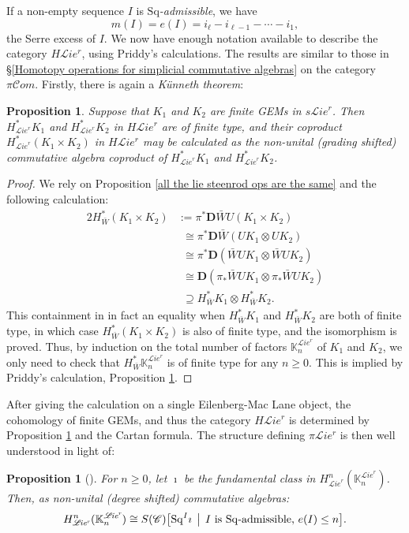 \documentclass[11pt]{amsart} \renewcommand{\baselinestretch}{1.4}
\theoremstyle{plain}
\newtheorem{prop}[thm]{Proposition}
\theoremstyle{definition}
\newcommand{\scrL}{\mathscr{L}}
\newcommand{\scrC}{\mathscr{C}}
\newcommand{\citeBOX}[2][]{\cite[\mbox{#1}]{#2}}
\newcommand{\CommOperad}{{\scrC}}
\newcommand{\PA}[1]{\pi#1}
\newcommand{\HA}[1]{H#1}
\newcommand{\minDimDelta}{m}
\newcommand{\Sq}{\mathrm{Sq}}
\newcommand{\algs}{{\scrC\!\textit{om}}}
\newcommand{\restliealgs}{{\scrL\!\textit{ie}^\textit{r}}}
\newcommand{\dual}{\mathbf{D}}
\begin{document}
\begin{Constructing cohomology operations}
If a non-empty sequence $I$  is \emph{$\Sq$-admissible}, we have 
\[\minDimDelta(I)=e(I)=i_\ell-i_{\ell-1}-\cdots -i_1,\]
the Serre excess of $I$. We now have enough notation available to describe the category $\HA{\restliealgs}$, using Priddy's calculations. The results are similar to those in \S\ref{Homotopy operations for simplicial commutative algebras} on the category $\PA{\algs}$.
Firstly, there is again  a \emph{K\"unneth theorem}:
\begin{prop}
\label{Prop on cohomology of product of finite lie gems}
Suppose that $K_1$ and $K_2$ are finite GEMs in $s\restliealgs$. Then $H^*_\restliealgs K_1$ and $H^*_\restliealgs K_2$ in $\HA{\restliealgs}$ are of finite type, and their coproduct
$H^*_\restliealgs(K_1\times K_2)$ in $\HA{\restliealgs}$ may be calculated as the non-unital (grading shifted) commutative algebra coproduct of $H^*_\restliealgs K_1$ and $H^*_\restliealgs K_2$.
\end{prop}
\begin{proof}
We rely on Proposition \ref{all the lie steenrod ops are the same} and the following calculation:
\begin{alignat*}{2}
H^*_{\bar{W}}(K_1\times K_2)
&:=
\pi^*\dual \bar{W}U(K_1\times K_2)%
\\
&\phantom{:}\cong
\pi^*\dual \bar{W}(UK_1\otimes UK_2)%
\\
&\phantom{:}\cong
\pi^*\dual (\bar{W}UK_1\otimes \bar{W}UK_2)%
\\
&\phantom{:}\cong
\dual (\pi_*\bar{W}UK_1\otimes \pi_*\bar{W}UK_2)%
\\
&\phantom{:}\supseteq
H^*_{\bar{W}}K_1\otimes H^*_{\bar{W}}K_2.
\end{alignat*}
This containment in in fact an equality when $H^*_{\bar{W}}K_1 $ and $H^*_{\bar{W}}K_2$ are both of finite type, in which case $H^*_{\bar{W}}(K_1\times K_2)$ is also of finite type, and the isomorphism is proved. Thus, by induction on the total number of factors $\mathbb{K}_n^{\restliealgs}$ of $K_1$ and $K_2$, we only need to check that $H^*_{\bar{W}}\mathbb{K}_n^{\restliealgs}$ is of finite type for any $n\geq0$. This is implied by Priddy's calculation, Proposition \ref{calc of restliecoh on single EMobject}.
\end{proof}
\noindent After giving the calculation on a single Eilenberg-Mac Lane object, the cohomology of finite GEMs, and thus the category $\HA{\restliealgs}$ is determined by Proposition \ref{Prop on cohomology of product of finite lie gems} and the Cartan formula. The structure defining $\PA{\restliealgs}$ is then well understood in light of:
\begin{prop}[{\citeBOX[6.1]{PriddySimplicialLie.pdf}}]
\label{calc of restliecoh on single EMobject}
For $n\geq0$, let $\imath$ be the fundamental class in $H^n_{\restliealgs}(\mathbb{K}_n^{\restliealgs})$. Then, as non-unital (degree shifted) commutative algebras:
\[H^n_{\restliealgs}(\mathbb{K}_n^{\restliealgs})\cong S(\CommOperad)\bigl[\Sq^I\imath\,\bigm|\,\textup{$I$ is $\Sq$-admissible, $e(I)\leq n$}\bigr].\]
\end{prop}


\end{Constructing cohomology operations}
\end{document}
